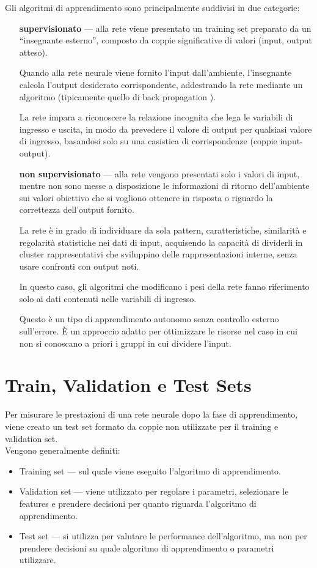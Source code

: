 Gli algoritmi di apprendimento sono principalmente suddivisi in due categorie:
\begin{itemize}
	\item[\bfseries supervisionato] --- alla rete viene presentato un training set preparato da un ``insegnante esterno'', composto da coppie significative di valori (input, output atteso).
	
	Quando alla rete neurale viene fornito l'input dall'ambiente, l'insegnante calcola l'output desiderato corrispondente, addestrando la rete mediante un algoritmo (tipicamente quello di back propagation \cite{horikawa1992fuzzy}). 
	
	La rete impara a riconoscere la relazione incognita che lega le variabili di ingresso e uscita, in modo da prevedere il valore di output per qualsiasi valore di ingresso, basandosi solo su una casistica di corrispondenze (coppie input-output).
	
	\item[\bfseries non supervisionato] --- alla rete vengono presentati solo i valori di input, mentre non sono messe a disposizione le informazioni di ritorno dell'ambiente sui valori obiettivo che si vogliono ottenere in risposta o riguardo la correttezza dell'output fornito.
	
	La rete è in grado di individuare da sola pattern, caratteristiche, similarità e regolarità statistiche nei dati di input, acquisendo la capacità di dividerli in cluster rappresentativi che sviluppino delle rappresentazioni interne, senza usare confronti con output noti.
	
	In questo caso, gli algoritmi che modificano i pesi della rete fanno riferimento solo ai dati contenuti nelle variabili di ingresso.
	
	Questo è un tipo di apprendimento autonomo senza controllo esterno sull'errore. È un approccio adatto per ottimizzare le risorse nel caso in cui non si conoscano a priori i gruppi in cui dividere l'input.
\end{itemize}

\section{Train, Validation e Test Sets}
\label{sec:set}
Per misurare le prestazioni di una rete neurale dopo la fase di apprendimento, viene creato un test set formato da coppie non utilizzate per il training e validation set.\\
Vengono generalmente definiti: 
\begin{itemize}
	\item Training set --- sul quale viene eseguito l'algoritmo di apprendimento.
	\item Validation set --- viene utilizzato per regolare i parametri, selezionare le features e prendere decisioni per quanto riguarda l'algoritmo di apprendimento.
	\item Test set --- si utilizza per valutare le performance dell'algoritmo, ma non per prendere decisioni su quale algoritmo di apprendimento o parametri utilizzare. 
\end{itemize}

